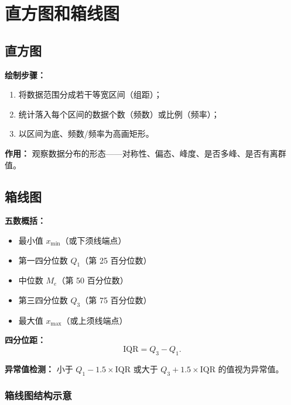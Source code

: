 \section{直方图和箱线图}

\subsection{直方图}

\textbf{绘制步骤：}
\begin{enumerate}
    \item 将数据范围分成若干等宽区间（组距）；
    \item 统计落入每个区间的数据个数（频数）或比例（频率）；
    \item 以区间为底、频数/频率为高画矩形。
\end{enumerate}

\textbf{作用：} 观察数据分布的形态——对称性、偏态、峰度、是否多峰、是否有离群值。

\subsection{箱线图}

\textbf{五数概括：}
\begin{itemize}
    \item 最小值 $x_{\min}$（或下须线端点）
    \item 第一四分位数 $Q_1$（第 25 百分位数）
    \item 中位数 $M_e$（第 50 百分位数）
    \item 第三四分位数 $Q_3$（第 75 百分位数）
    \item 最大值 $x_{\max}$（或上须线端点）
\end{itemize}

\textbf{四分位距：}
\begin{equation}
    \mathrm{IQR} = Q_3 - Q_1.
\end{equation}

\textbf{异常值检测：} 小于 $Q_1 - 1.5 \times \mathrm{IQR}$ 或大于 $Q_3 + 1.5 \times \mathrm{IQR}$ 的值视为异常值。

\subsubsection{箱线图结构示意}

